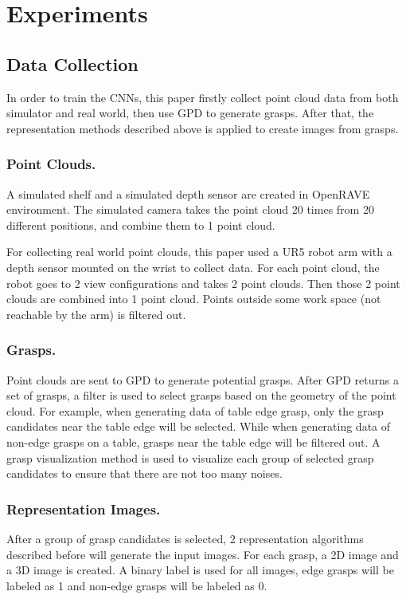 \documentclass[letterpaper]{article} %
\begin{document}
\section{Experiments}
\subsection{Data Collection}
In order to train the CNNs, this paper firstly collect point cloud data from both simulator and real world, then use GPD \cite{RN6} to generate grasps. After that, the representation methods described above is applied to create images from grasps.

\subsubsection{Point Clouds.} A simulated shelf and a simulated depth sensor are created in OpenRAVE environment. The simulated camera takes the point cloud 20 times from 20 different positions, and combine them to 1 point cloud. 

For collecting real world point clouds, this paper used a UR5 robot arm with a depth sensor mounted on the wrist to collect data. For each point cloud, the robot goes to 2 view configurations and takes 2 point clouds. Then those 2 point clouds are combined into 1 point cloud. Points outside some work space (not reachable by the arm) is filtered out. 

\subsubsection{Grasps.} Point clouds are sent to GPD \cite{RN6} to generate potential grasps. After GPD returns a set of grasps, a filter is used to select grasps based on the geometry of the point cloud. For example, when generating data of table edge grasp, only the grasp candidates near the table edge will be selected. While when generating data of non-edge grasps on a table, grasps near the table edge will be filtered out. A grasp visualization method is used to visualize each group of selected grasp candidates to ensure that there are not too many noises. 

\subsubsection{Representation Images.} After a group of grasp candidates is selected, 2 representation algorithms described before will generate the input images. For each grasp, a 2D image and a 3D image is created. A binary label is used for all images, edge grasps will be labeled as 1 and non-edge grasps will be labeled as 0.
\end{document}
